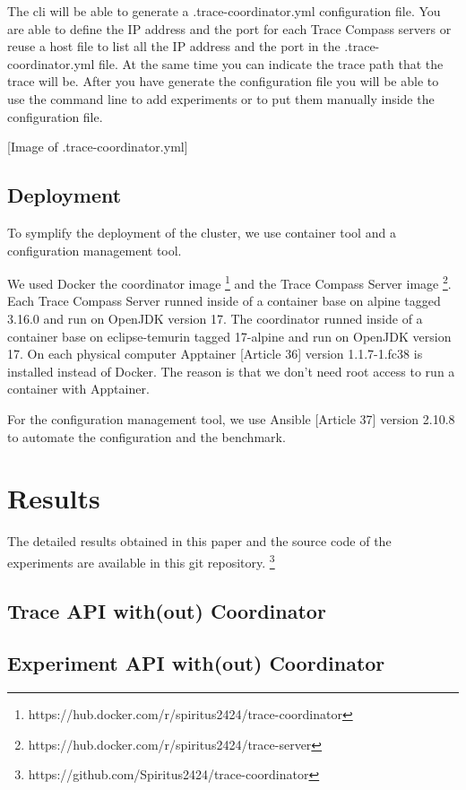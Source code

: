 The cli will be able to generate a .trace-coordinator.yml configuration file. You are able to define the IP address and the port for each Trace Compass servers or reuse a host file to list all the IP address and the port in the .trace-coordinator.yml file. At the same time you can indicate the trace path that the trace will be. After you have generate the configuration file you will be able to use the command line to add experiments or to put them manually inside the configuration file.

[Image of .trace-coordinator.yml]

\subsection{Deployment}

To symplify the deployment of the cluster, we use container tool and a configuration management tool.

We used Docker the coordinator image \footnote{https://hub.docker.com/r/spiritus2424/trace-coordinator} and the Trace Compass Server image \footnote{https://hub.docker.com/r/spiritus2424/trace-server}. Each Trace Compass Server runned inside of a container base on alpine tagged 3.16.0 and run on OpenJDK version 17. The coordinator runned inside of a container base on eclipse-temurin tagged 17-alpine and run on OpenJDK version 17. On each physical computer Apptainer [Article 36] version 1.1.7-1.fc38 is installed instead of Docker. The reason is that we don't need root access to run a container with Apptainer.

For the configuration management tool, we use Ansible [Article 37] version 2.10.8 to automate the configuration and the benchmark.

\section{Results}

The detailed results obtained in this paper and the source code of the experiments are available in this git repository. \footnote{https://github.com/Spiritus2424/trace-coordinator}

\subsection{Trace API with(out) Coordinator}

\subsection{Experiment API with(out) Coordinator}

